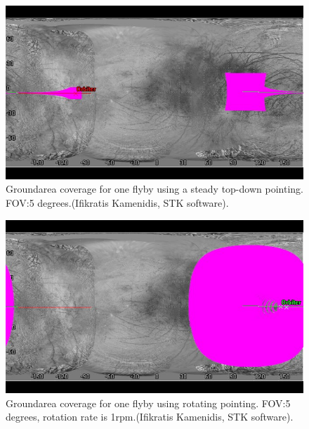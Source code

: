 \begin{figure}[htb!]
\centering
\includegraphics[width=\textwidth]{figures/Orbiter/steady_cover.png}
\caption{Groundarea coverage for one flyby using a steady top-down pointing. FOV:5 degrees.(Ifikratis Kamenidis, STK software).}
\label{steadycov}
\end{figure}

\begin{figure}[htb!]
\centering
\includegraphics[width=\textwidth]{figures/Orbiter/rot_cover.png}
\caption{Groundarea coverage for one flyby using rotating pointing. FOV:5 degrees, rotation rate is 1rpm.(Ifikratis Kamenidis, STK software).}
\label{rot_cover}
\end{figure}

